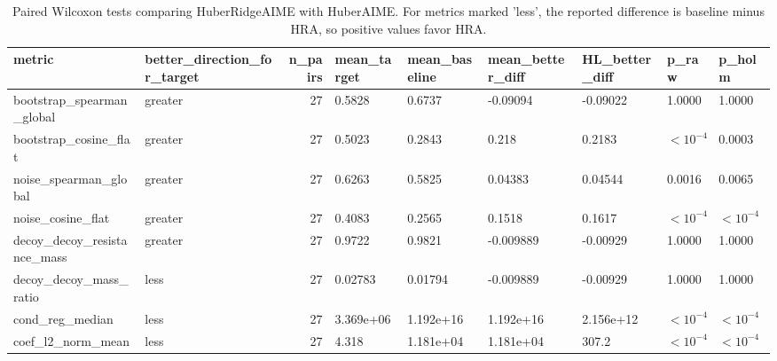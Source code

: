 \begin{table}[t]
\centering
\begin{tabular}{llrllllll}
\toprule
metric & better_direction_for_target & n_pairs & mean_target & mean_baseline & mean_better_diff & HL_better_diff & p_raw & p_holm \\
\midrule
bootstrap_spearman_global & greater & 27 & 0.5828 & 0.6737 & -0.09094 & -0.09022 & 1.0000 & 1.0000 \\
bootstrap_cosine_flat & greater & 27 & 0.5023 & 0.2843 & 0.218 & 0.2183 & $<10^{-4}$ & 0.0003 \\
noise_spearman_global & greater & 27 & 0.6263 & 0.5825 & 0.04383 & 0.04544 & 0.0016 & 0.0065 \\
noise_cosine_flat & greater & 27 & 0.4083 & 0.2565 & 0.1518 & 0.1617 & $<10^{-4}$ & $<10^{-4}$ \\
decoy_decoy_resistance_mass & greater & 27 & 0.9722 & 0.9821 & -0.009889 & -0.00929 & 1.0000 & 1.0000 \\
decoy_decoy_mass_ratio & less & 27 & 0.02783 & 0.01794 & -0.009889 & -0.00929 & 1.0000 & 1.0000 \\
cond_reg_median & less & 27 & 3.369e+06 & 1.192e+16 & 1.192e+16 & 2.156e+12 & $<10^{-4}$ & $<10^{-4}$ \\
coef_l2_norm_mean & less & 27 & 4.318 & 1.181e+04 & 1.181e+04 & 307.2 & $<10^{-4}$ & $<10^{-4}$ \\
\bottomrule
\end{tabular}

\caption{Paired Wilcoxon tests comparing HuberRidgeAIME with HuberAIME. For metrics marked 'less', the reported difference is baseline minus HRA, so positive values favor HRA.}
\label{tab:revision_paired_hra_huberaime_joint_high}
\end{table}